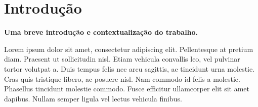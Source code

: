 \section{Introdução}
\textbf{Uma breve introdução e contextualização do trabalho.}

Lorem ipsum dolor sit amet, consectetur adipiscing elit. Pellentesque at pretium
diam. Praesent ut sollicitudin nisl. Etiam vehicula convallis leo, vel pulvinar tortor
volutpat a. Duis tempus felis nec arcu sagittis, ac tincidunt urna molestie. Cras quis
tristique libero, ac posuere nisl. Nam commodo id felis a molestie. Phasellus tincidunt
molestie commodo. Fusce efficitur ullamcorper elit sit amet dapibus. Nullam semper
ligula vel lectus vehicula finibus.